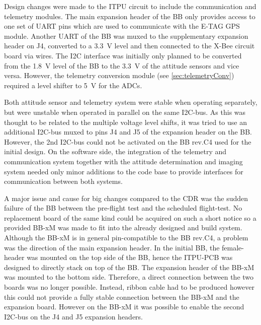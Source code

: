Design changes were made to the ITPU circuit to include the communication and telemetry modules. The main expansion header of the \ac{BB} only provides access to one set of \ac{UART} pins which are used to communicate with the E-TAG GPS module. Another UART of the BB was muxed to the supplementary expansion header on J4, converted to a 3.3~V level and then connected to the X-Bee circuit board via wires. The \ac{I2C} interface was initially only planned to be converted from the 1.8~V level of the BB to the 3.3~V of the attitude sensors and vice versa. However, the telemetry conversion module (see \ref{sec:telemetryConv}) required a level shifter to 5~V for the ADCs. 

Both attitude sensor and telemetry system were stable when operating separately, but were unstable when operated in parallel on the same I2C-bus. As this was thought to be related to the multiple voltage level shifts, it was tried to use an additional I2C-bus muxed to pins J4 and J5 of the expansion header on the BB. However, the 2nd I2C-bus could not be activated on the BB rev.C4 used for the initial design.
On the software side, the integration of the telemetry and communication system together with the attitude determination and imaging system needed only minor additions to the code base to provide interfaces for communication between both systems. 

A major issue and cause for big changes compared to the CDR was the sudden failure of the BB between the pre-flight test and the scheduled flight-test. No replacement board of the same kind could be acquired on such a short notice so a provided BB-xM was made to fit into the already designed and build system. Although the BB-xM is in general pin-compatible to the BB rev.C4, a problem was the direction of the main expansion header. In the initial BB, the female-header was mounted on the top side of the BB, hence the ITPU-PCB was designed to directly stack on top of the BB. The expansion header of the BB-xM was mounted to the bottom side. Therefore, a direct connection between the two boards was no longer possible. Instead, ribbon cable had to be produced however this could not provide a fully stable connection between the BB-xM and the expansion board. However on the BB-xM it was possible to enable the second I2C-bus on the J4 and J5 expansion headers.
